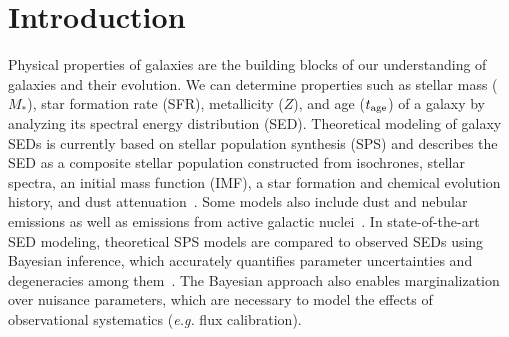 \section{Introduction} \label{sec:intro} 
Physical properties of galaxies are the building
blocks of our understanding of galaxies and their evolution. 
We can determine properties such as stellar mass ($M_*$), star formation rate (SFR), metallicity
($Z$), and age ($t_{\rm age}$) of a galaxy by analyzing its
spectral energy distribution (SED).
Theoretical modeling of galaxy SEDs is currently based on stellar population
synthesis (SPS) and describes the SED as a composite stellar population constructed
from isochrones, stellar spectra, an initial mass function (IMF), a star
formation and chemical evolution history, and dust
attenuation~\citep[\emph{e.g.}][see \citealt{walcher2011, conroy2013} for a
comprehensive review]{bruzual2003, maraston2005, conroy2009}.
Some models also include dust and nebular emissions as well as emissions from
active galactic nuclei~\citep[\emph{e.g.}][]{johnson2021}.
In state-of-the-art SED modeling, theoretical SPS models are compared to
observed SEDs using Bayesian inference, which accurately quantifies parameter
uncertainties and degeneracies among them~\citep{acquaviva2011,
chevallard2016, leja2017, carnall2018, johnson2021, hahn2022}. 
The Bayesian approach also enables marginalization over nuisance parameters,
which are necessary to model the effects of observational systematics
(\emph{e.g.} flux calibration).

